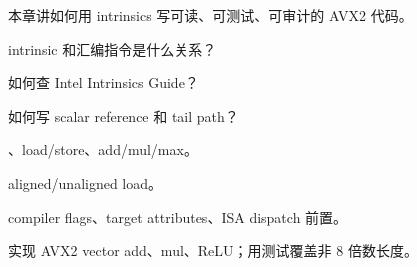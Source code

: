 {本章讲如何用 intrinsics 写可读、可测试、可审计的 AVX2 代码。}
{\item intrinsic 和汇编指令是什么关系？
\item 如何查 Intel Intrinsics Guide？
\item 如何写 scalar reference 和 tail path？}
{\item {}、load/store、add/mul/max。
\item aligned/unaligned load。
\item compiler flags、target attributes、ISA dispatch 前置。}
{实现 AVX2 vector add、mul、ReLU；用测试覆盖非 8 倍数长度。}
